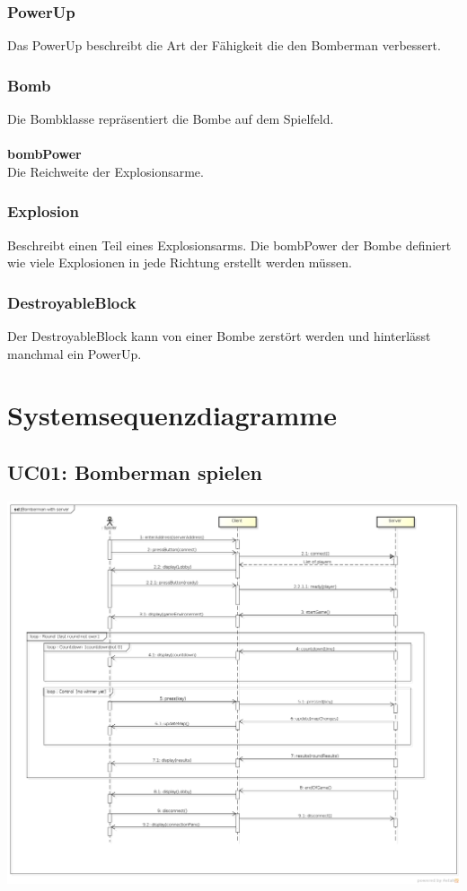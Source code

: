 \documentclass[11pt]{scrartcl}
\begin{document}
\subsubsection{PowerUp}
\label{sec:PowerUp}
Das PowerUp beschreibt die Art der Fähigkeit die den Bomberman verbessert.

\newpage

\subsubsection{Bomb}
\label{sec:Bomb}
Die Bombklasse repräsentiert die Bombe auf dem Spielfeld.
\\\\
\textbf{bombPower}\\
Die Reichweite der Explosionsarme.

\subsubsection{Explosion}
\label{sec:Explosion}
Beschreibt einen Teil eines Explosionsarms. Die bombPower der Bombe definiert wie viele Explosionen in jede Richtung erstellt werden müssen.

\subsubsection{DestroyableBlock}
\label{sec:DestroyableBlock}
Der DestroyableBlock kann von einer Bombe zerstört werden und hinterlässt manchmal ein PowerUp.


\section{Systemsequenzdiagramme}
\label{sec:Systemsequenzdiagramme}
\subsection{UC01: Bomberman spielen}
\label{sec:UC01: Bomberman spielen}
\begin{center}
\includegraphics[scale=0.3]{SystemSequenzDiagramm_JBomberman} 
\end{center}
\end{document}
